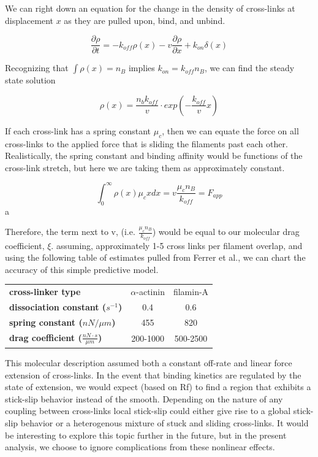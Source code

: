 \documentclass[pre,preprint]{revtex4-1}
\begin{document}
We can right down an equation for the change in the density of cross-links at displacement $x$ as they are pulled upon, bind, and unbind.

\begin{equation}
\frac{\partial \rho}{\partial t} = -k_{off}\rho(x) - v\frac{\partial \rho}{\partial x} + k_{on}\delta(x)
\end{equation}

Recognizing that $\int \rho(x)=n_B$ implies $k_{on}=k_{off}n_B$, we can find the steady state solution

\begin{equation}
\rho(x) = \frac{n_b k_{off}}{v}\cdot exp\left ( -\frac{k_{off}}{v}x \right )
\end{equation}

If each cross-link has a spring constant $\mu_c$, then we can equate the force on all cross-links to the applied force that is sliding the filaments past each other.  Realistically, the spring constant and binding affinity would be functions of the cross-link stretch, but here we are taking them as approximately constant.  

\begin{equation}
\int_{0}^{\infty}\rho(x)\mu_cx dx = v \frac{\mu_c n_B}{k_{off}}= F_{app}
\end{equation}a

Therefore, the term next to v, (i.e. $\tfrac{\mu_c n_B}{k_{off}}$) would be equal to our molecular drag coefficient, $\xi$.  assuming, approximately 1-5 cross links per filament overlap, and using the following table of estimates pulled from Ferrer et al., we can chart the accuracy of this simple predictive model.

\begin{table}[h]
\begin{tabular}{| l | c | c |}
\hline
\textbf{cross-linker type} & $\alpha$-actinin & filamin-A  \\ \cline{1-1}
\textbf{dissociation constant ($s^{-1}$)} & 0.4 & 0.6 \\ \cline{1-1}
\textbf{spring constant ($nN / \mu m$)} & 455 & 820 \\ \cline{1-1}
\textbf{drag coefficient ($\tfrac{nN \cdot s}{\mu m}$)} & 200-1000 & 500-2500 \\ 
\hline
\end{tabular}
\end{table}



This molecular description assumed both a constant off-rate and linear force extension of cross-links.  In the event that binding kinetics are regulated by the state of extension, we would expect (based on Rf) to find a region that exhibits a stick-slip behavior instead of the smooth.  Depending on the nature of any coupling between cross-links local stick-slip could either give rise to a global stick-slip behavior or a heterogenous mixture of stuck and sliding cross-links.  It would be interesting to explore this topic further in the future, but in the present analysis, we choose to ignore complications from these nonlinear effects.
\end{document}

